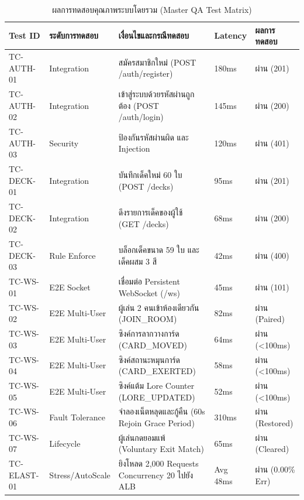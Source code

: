\documentclass[12pt,a4paper]{report}
\begin{document}
\begin{table}[H]
\centering
\caption{ผลการทดสอบคุณภาพระบบโดยรวม (Master QA Test Matrix)}
\label{tab:qa_results}
\small
\begin{tabularx}{\textwidth}{p{1.4cm}p{2.2cm}>{\raggedright\arraybackslash}Xp{1.5cm}p{1.5cm}}
\toprule
\textbf{Test ID} & \textbf{ระดับการทดสอบ} & \textbf{เงื่อนไขและกรณีทดสอบ} & \textbf{Latency} & \textbf{ผลการทดสอบ} \\
\midrule
TC-AUTH-01 & Integration & สมัครสมาชิกใหม่ (POST /auth/register) & 180ms & ผ่าน (201) \\
TC-AUTH-02 & Integration & เข้าสู่ระบบด้วยรหัสผ่านถูกต้อง (POST /auth/login) & 145ms & ผ่าน (200) \\
TC-AUTH-03 & Security & ป้องกันรหัสผ่านผิด และ Injection & 120ms & ผ่าน (401) \\
TC-DECK-01 & Integration & บันทึกเด็คใหม่ 60 ใบ (POST /decks) & 95ms & ผ่าน (201) \\
TC-DECK-02 & Integration & ดึงรายการเด็คของผู้ใช้ (GET /decks) & 68ms & ผ่าน (200) \\
TC-DECK-03 & Rule Enforce & บล็อกเด็คขนาด 59 ใบ และเด็คผสม 3 สี & 42ms & ผ่าน (400) \\
TC-WS-01 & E2E Socket & เชื่อมต่อ Persistent WebSocket (/ws) & 45ms & ผ่าน (101) \\
TC-WS-02 & E2E Multi-User & ผู้เล่น 2 คนเข้าห้องเดียวกัน (JOIN\_ROOM) & 82ms & ผ่าน (Paired) \\
TC-WS-03 & E2E Multi-User & ซิงค์การลากวางการ์ด (CARD\_MOVED) & 64ms & ผ่าน (<100ms) \\
TC-WS-04 & E2E Multi-User & ซิงค์สถานะหมุนการ์ด (CARD\_EXERTED) & 58ms & ผ่าน (<100ms) \\
TC-WS-05 & E2E Multi-User & ซิงค์แต้ม Lore Counter (LORE\_UPDATED) & 52ms & ผ่าน (<100ms) \\
TC-WS-06 & Fault Tolerance & จำลองเน็ตหลุดและกู้คืน (60s Rejoin Grace Period) & 310ms & ผ่าน (Restored) \\
TC-WS-07 & Lifecycle & ผู้เล่นกดยอมแพ้ (Voluntary Exit Match) & 65ms & ผ่าน (Cleared) \\
TC-ELAST-01 & Stress/AutoScale & ยิงโหลด 2,000 Requests Concurrency 20 ไปยัง ALB & Avg 48ms & ผ่าน (0.00\% Err) \\
\bottomrule
\end{tabularx}
\end{table}
\end{document}
